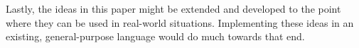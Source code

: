 Lastly, the ideas in this paper might be extended and developed to the point where they can be used in real-world situations. Implementing these ideas in an existing, general-purpose language would do much towards that end.







